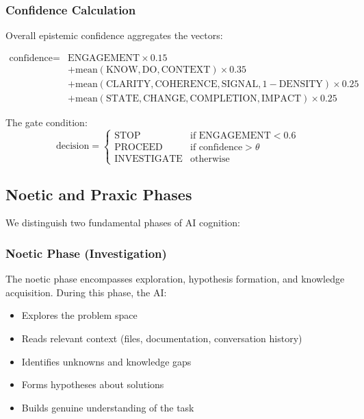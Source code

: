 \subsubsection{Confidence Calculation}

Overall epistemic confidence aggregates the vectors:

\begin{equation}
\begin{aligned}
\text{confidence} = {} & \text{ENGAGEMENT} \times 0.15 \\
                      & + \text{mean}(\text{KNOW}, \text{DO}, \text{CONTEXT}) \times 0.35 \\
                      & + \text{mean}(\text{CLARITY}, \text{COHERENCE}, \text{SIGNAL}, 1-\text{DENSITY}) \times 0.25 \\
                      & + \text{mean}(\text{STATE}, \text{CHANGE}, \text{COMPLETION}, \text{IMPACT}) \times 0.25
\end{aligned}
\end{equation}

The gate condition:
\begin{equation}
\text{decision} =
\begin{cases}
\text{STOP} & \text{if ENGAGEMENT} < 0.6 \\
\text{PROCEED} & \text{if confidence} > \theta \\
\text{INVESTIGATE} & \text{otherwise}
\end{cases}
\end{equation}

\subsection{Noetic and Praxic Phases}

We distinguish two fundamental phases of AI cognition:

\subsubsection{Noetic Phase (Investigation)}

The noetic phase encompasses exploration, hypothesis formation, and knowledge acquisition. During this phase, the AI:

\begin{itemize}
    \item Explores the problem space
    \item Reads relevant context (files, documentation, conversation history)
    \item Identifies unknowns and knowledge gaps
    \item Forms hypotheses about solutions
    \item Builds genuine understanding of the task
\end{itemize}

